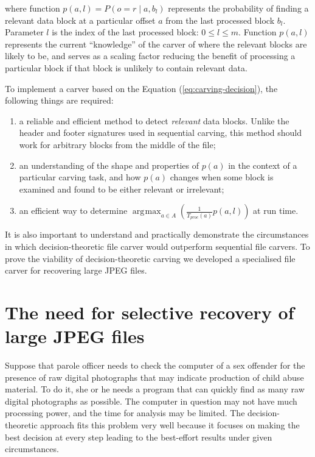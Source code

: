 \documentclass[final,5p,times,twocolumn,authoryear]{elsarticle}
\DeclareMathOperator*{\argmax}{\arg\!\max}
\begin{document}
where function $p(a,l) = P(o=r \mid a,b_l)$ represents the probability of finding a relevant data block at a particular offset $a$ from the last processed block $b_l$. Parameter $l$ is the index of the last processed block: $0 \leq l \leq m$. Function $p(a,l)$ represents the current ``knowledge'' of the carver of where the relevant blocks are likely to be, and serves as a scaling factor reducing the benefit of processing a particular block if that block is unlikely to contain relevant data.

To implement a carver based on the Equation (\ref{eq:carving-decision}), the following things are required:

\begin{enumerate}
\item{a reliable and efficient method to detect \emph{relevant} data blocks. Unlike the header and footer signatures used in sequential carving, this method should work for arbitrary blocks from the middle of the file;}
\item{an understanding of the shape and properties of $p(a)$ in the context of a particular carving task, and how $p(a)$ changes when some block is examined and found to be either relevant or irrelevant;}
\item{an efficient way to determine $\argmax_{a \in A} \left( \frac{1}{T_{proc}(a)} p(a,l)\right)$ at run time.}

\end{enumerate}

It is also important to understand and practically demonstrate the circumstances in which decision-theoretic file carver would outperform sequential file carvers. To prove the viability of decision-theoretic carving we developed a specialised file carver for recovering large JPEG files. 

\section{The need for selective recovery of large JPEG files}

Suppose that parole officer needs to check the computer of a sex offender for the presence of raw digital photographs that may indicate production of child abuse material. To do it, she or he needs a program that can quickly find as many raw digital photographs as possible. The computer in question may not have much processing power, and the time for analysis may be limited. The decision-theoretic approach fits this problem very well because it focuses on making the best decision at every step leading to the best-effort results under given circumstances.  
\end{document}
